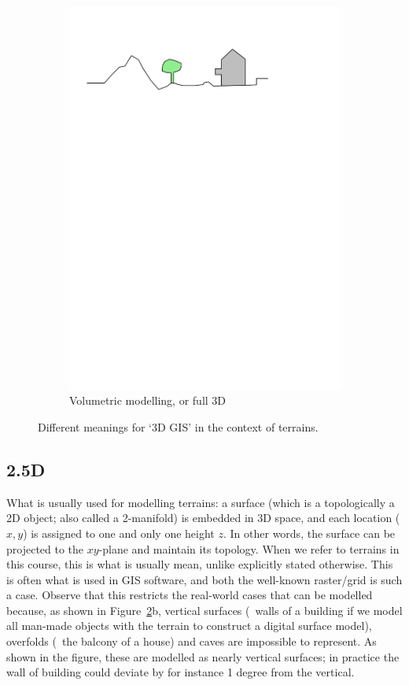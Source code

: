 \begin{figure}[b]
\begin{subfigure}[b]{0.45\linewidth}
    \includegraphics[page=4,width=\linewidth]{figs/dimgis}
    \caption{Volumetric modelling, or full 3D}\label{fig:dimgis:3}
  \end{subfigure}%
  \caption{Different meanings for `3D GIS' in the context of terrains.}%
  \label{fig:dimgis}
\end{figure}

\subsection{2.5D}%
What is usually used for modelling terrains: a surface (which is a topologically a 2D object; also called a 2-manifold) 
is embedded in 3D space, and each location ($x,y$) is assigned to one and only one height $z$.
In other words, the surface can be projected to the $xy$-plane and maintain its topology.
When we refer to terrains in this course, this is what is usually mean, unlike explicitly stated otherwise.
This is often what is used in GIS software, and both the well-known raster/grid  is such a case.
Observe that this restricts the real-world cases that can be modelled because, as shown in Figure~\ref{fig:dimgis}b, vertical surfaces (\eg\ walls of a building if we model all man-made objects with the terrain to construct a digital surface model), overfolds (\eg\ the balcony of a house) and caves are impossible to represent.
As shown in the figure, these are modelled as nearly vertical surfaces; in practice the wall of building could deviate by for instance 1 degree from the vertical. 


